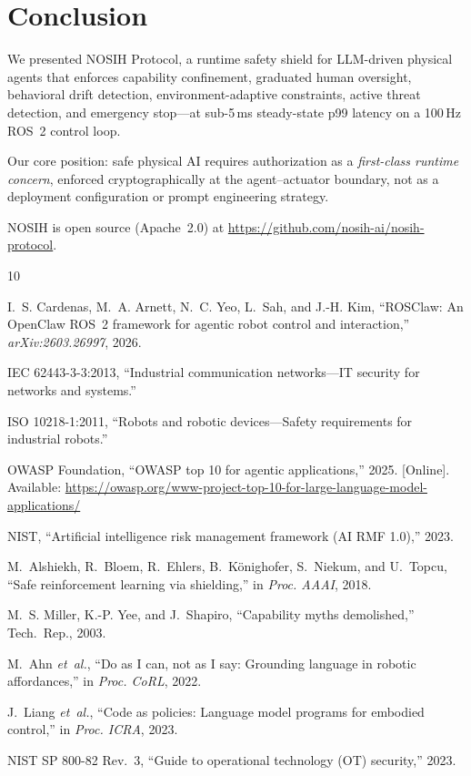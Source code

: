 \documentclass[conference]{IEEEtran}
\begin{document}
\section{Conclusion}
\label{sec:conclusion}

We presented NOSIH Protocol, a runtime safety shield for LLM-driven physical
agents that enforces capability confinement, graduated human oversight,
behavioral drift detection, environment-adaptive constraints, active threat
detection, and emergency stop---at sub-5\,ms steady-state p99 latency on a
100\,Hz ROS~2 control loop.

Our core position: safe physical AI requires authorization as a
\emph{first-class runtime concern}, enforced cryptographically at the
agent--actuator boundary, not as a deployment configuration or prompt
engineering strategy.

NOSIH is open source (Apache~2.0) at
\url{https://github.com/nosih-ai/nosih-protocol}.



\begin{thebibliography}{10}

I.~S. Cardenas, M.~A. Arnett, N.~C. Yeo, L.~Sah, and J.-H. Kim,
``ROSClaw: An OpenClaw ROS~2 framework for agentic robot control and
interaction,'' \emph{arXiv:2603.26997}, 2026.

{IEC 62443-3-3:2013},
``Industrial communication networks---IT security for networks and systems.''

{ISO 10218-1:2011},
``Robots and robotic devices---Safety requirements for industrial robots.''

{OWASP Foundation},
``OWASP top 10 for agentic applications,'' 2025. [Online]. Available:
\url{https://owasp.org/www-project-top-10-for-large-language-model-applications/}

{NIST},
``Artificial intelligence risk management framework (AI RMF 1.0),'' 2023.

M.~Alshiekh, R.~Bloem, R.~Ehlers, B.~K{\"o}nighofer, S.~Niekum, and
U.~Topcu,
``Safe reinforcement learning via shielding,'' in \emph{Proc. AAAI}, 2018.

M.~S. Miller, K.-P. Yee, and J.~Shapiro,
``Capability myths demolished,'' Tech.\ Rep., 2003.

M.~Ahn \emph{et~al.},
``Do as I can, not as I say: Grounding language in robotic affordances,''
in \emph{Proc. CoRL}, 2022.

J.~Liang \emph{et~al.},
``Code as policies: Language model programs for embodied control,''
in \emph{Proc. ICRA}, 2023.

{NIST SP 800-82 Rev.~3},
``Guide to operational technology (OT) security,'' 2023.

\end{thebibliography}
\end{document}
